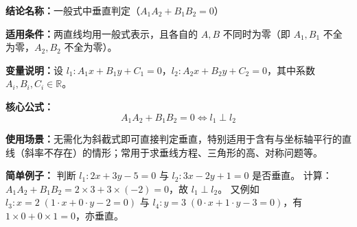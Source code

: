 \textbf{结论名称：}一般式中垂直判定（\(A_1A_2+B_1B_2=0\)）

\textbf{适用条件：}两直线均用一般式表示，且各自的 \(A,B\) 不同时为零（即 \(A_1,B_1\) 不全为零，\(A_2,B_2\) 不全为零）。

\textbf{变量说明：}设 \(l_1:A_1x+B_1y+C_1=0\)，\(l_2:A_2x+B_2y+C_2=0\)，其中系数 \(A_i,B_i,C_i\in\mathbb{R}\)。

\textbf{核心公式：}
\[
\boxed{A_1A_2+B_1B_2 = 0 \iff l_1 \perp l_2}
\]

\textbf{使用场景：}无需化为斜截式即可直接判定垂直，特别适用于含有与坐标轴平行的直线（斜率不存在）的情形；常用于求垂线方程、三角形的高、对称问题等。

\textbf{简单例子：}
判断 \(l_1:2x+3y-5=0\) 与 \(l_2:3x-2y+1=0\) 是否垂直。
计算：\(A_1A_2+B_1B_2=2\times3+3\times(-2)=0\)，故 \(l_1\perp l_2\)。
又例如 \(l_3:x=2\;(1\cdot x+0\cdot y-2=0)\) 与 \(l_4:y=3\;(0\cdot x+1\cdot y-3=0)\)，有 \(1\times0+0\times1=0\)，亦垂直。